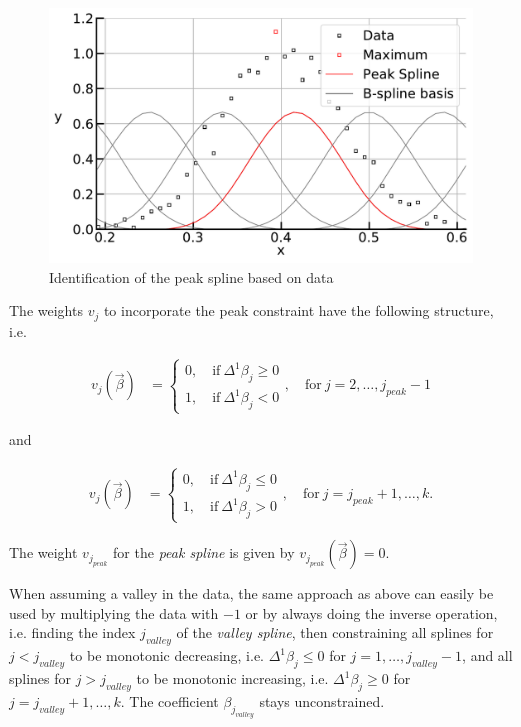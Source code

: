 \documentclass[10pt,a4paper]{report}
\begin{document}
\begin{figure}[H]
	\centering
	\includegraphics[width=\linewidth]{../thesisplots/peak_spline.pdf}
	\caption{Identification of the peak spline based on data}
	\label{fig:peak_spline}
\end{figure}


The weights $v_j$ to incorporate the peak constraint have the following structure, i.e.

\begin{align}\label{eq:v_peak_1}
	v_j(\vec{\beta}) &= \begin{cases} 
		0, \quad \text{if} \ \Delta^1\beta_j \ge 0 \\ 
		1, \quad \text{if} \ \Delta^1\beta_j  < 0
	\end{cases}, \quad \text{for} \ j=2, \dots, j_{peak}-1
\end{align}

and 

\begin{align}\label{eq:v_peak_2}
	v_j(\vec{\beta}) &= \begin{cases} 
		0, \quad \text{if} \ \Delta^1\beta_j \le 0 \\ 
		1, \quad \text{if} \ \Delta^1\beta_j > 0
	\end{cases}, \quad \text{for} \ j=j_{peak}+1, \dots, k.
\end{align}

The weight $v_{j_{peak}}$ for the \emph{peak spline} is given by $v_{j_{peak}}(\vec{\beta}) = 0$. 

When assuming a valley in the data, the same approach as above can easily be used by multiplying the data with $-1$ or by always doing the inverse operation, i.e. finding the index $j_{valley}$ of the \emph{valley spline}, then constraining all splines for $j < j_{valley}$ to be monotonic decreasing, i.e. $\Delta^1 \beta_j \le 0$ for $j = 1, \dots, j_{valley}-1$, and all splines for $j > j_{valley}$ to be monotonic increasing, i.e. $\Delta^1 \beta_j \ge 0$ for $j = j_{valley}+1, \dots, k$. The coefficient $\beta_{j_{valley}}$ stays unconstrained. 
\end{document}
